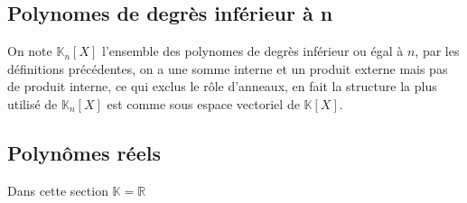 \documentclass[11pt,colorlinks]{book}
\theoremstyle{mytheoremstyle}
\theoremstyle{mytheoremstyle}
\theoremstyle{mytheoremstyle}
\theoremstyle{mytheoremstyle}
\theoremstyle{mytheoremstyle}
\theoremstyle{mytheoremstyle}
\theoremstyle{mytheoremstyle}
\theoremstyle{mytheoremstyle}
\theoremstyle{myproblemstyle}
\def\mbb#1{\mathbb{#1}}
\def\bR{\mbb{R}}
\def\bK{\mbb{K}}
\begin{document}
\subsection{Polynomes de degrès inférieur à n}
\begin{definition}
  On note $\bK_n[X]$ l'ensemble des polynomes de degrès inférieur ou égal à $n$, par les définitions précédentes, on a une somme interne et 
  un produit externe mais pas de produit interne, ce qui exclus le rôle d'anneaux, en fait la structure la plus utilisé de $\bK_n[X]$ est comme 
  sous espace vectoriel de $\bK[X]$.
\end{definition}
\subsection{Polynômes réels}
\begin{rmq}
  Dans cette section $\bK = \bR$
\end{rmq}
\end{document}
